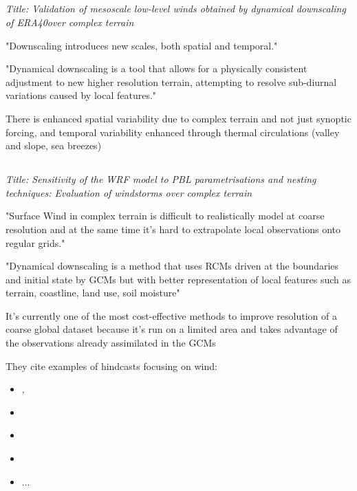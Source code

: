 \documentclass[12pt,a4paper]{article}
\begin{document}
\subsection{\cite{Zagar2006}}

\textit{Title: Validation of mesoscale low-level winds obtained by dynamical downscaling of ERA40over complex terrain}
 
"Downscaling introduces new scales, both spatial and temporal."

"Dynamical downscaling is a tool that allows for a physically consistent adjustment to new higher resolution terrain, attempting to resolve sub-diurnal variations caused by local features."

There is enhanced spatial variability due to complex terrain and not just synoptic forcing, and temporal variability enhanced through thermal circulations (valley and slope, sea breezes) 


\subsection{\cite{Gomez-Navarro2015}}

\textit{Title:  Sensitivity of the WRF model to PBL parametrisations and nesting techniques: Evaluation of windstorms over complex terrain}

"Surface Wind in complex terrain is difficult to realistically model at coarse resolution and at the same time it's hard to extrapolate local observations onto regular grids."

"Dynamical downscaling is a method that uses RCMs driven at the boundaries and initial state by GCMs but with better representation of local features such as terrain, coastline, land use, soil moisture"

It's currently one of the most cost-effective methods to improve resolution of a coarse global dataset because it's run on a limited area and takes advantage of the observations already assimilated in the GCMs

They cite examples of hindcasts focusing on wind: 

\begin{itemize}
    \item \cite{Jimenez2010}, 
    \item \cite{Garcia-Diez2015}
    \item \cite{Menendez2014}
    \item \cite{Lorente-Plazas2015}
    \item ...
\end{itemize}
\end{document}
